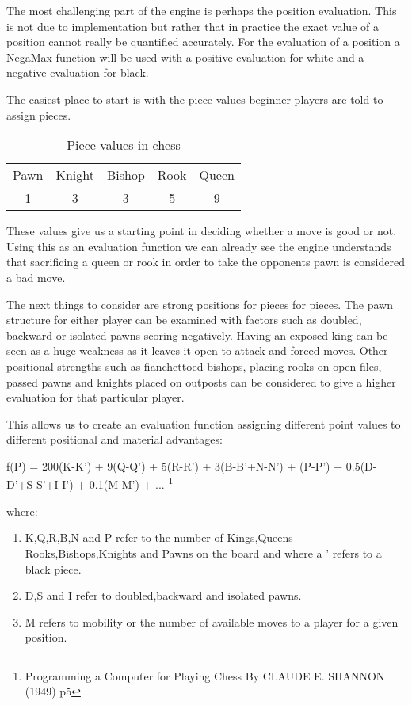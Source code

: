 \documentclass[11pt]{report}
\begin{document}
The most challenging part of the engine is perhaps the position evaluation. This is not due to implementation but rather that in practice the exact value of a position cannot really be quantified accurately. For the evaluation of a position a NegaMax function will be used with a positive evaluation for white and a negative evaluation for black.\newline


The easiest place to start is with the piece values beginner players are told to assign pieces.

\begin{table}[h]
\centering
\begin{tabular}{ccccc}
Pawn & Knight & Bishop & Rook & Queen \\
1    & 3      & 3      & 5    & 9    
\end{tabular}
\caption{Piece values in chess}
\end{table}

These values give us a starting point in deciding whether a move is good or not. Using this as an evaluation function we can already see the engine understands that sacrificing a queen or rook in order to take the opponents pawn is considered a bad move.\newline

The next things to consider are strong positions for pieces for pieces. The pawn structure for either player can be examined with factors such as doubled, backward or isolated pawns scoring negatively. Having an exposed king can be seen as a huge weakness as it leaves it open to attack and forced moves. Other positional strengths such as fianchettoed bishops, placing rooks on open files, passed pawns and knights placed on outposts can be considered to give a higher evaluation for that particular player. \newline

This allows us to create an evaluation function assigning different point values to different positional and material advantages: \newline

{\Large f(P) = 200(K-K') + 9(Q-Q') + 5(R-R') + 3(B-B'+N-N') + (P-P') + 0.5(D-D'+S-S'+I-I') + 0.1(M-M') + ...
}\footnote{Programming a Computer for Playing Chess By CLAUDE E. SHANNON (1949) p5}

where:
\begin{enumerate}
\item K,Q,R,B,N and P refer to the number of Kings,Queens Rooks,Bishops,Knights and Pawns on the board and where a ' refers to a black piece.
\item D,S and I refer to doubled,backward and isolated pawns.
\item M refers to mobility or the number of available moves to a player for a given position.
\end{enumerate}
\end{document}
